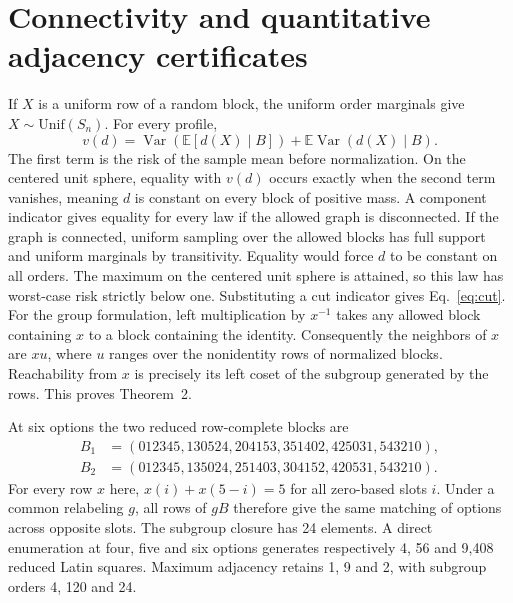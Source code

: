 \section{Connectivity and quantitative adjacency certificates}
\label{app:connectivity}
If $X$ is a uniform row of a random block, the uniform order marginals
give $X\sim\mathrm{Unif}(S_n)$. For every profile,
\[
 v(d)=\operatorname{Var}(\mathbb E[d(X)\mid B])
      +\mathbb E\operatorname{Var}(d(X)\mid B).
\]
The first term is the risk of the sample mean before normalization.
On the centered unit sphere, equality with $v(d)$ occurs exactly when
the second term vanishes, meaning $d$ is constant on every block of
positive mass. A component indicator gives equality for every law if
the allowed graph is disconnected. If the graph is connected, uniform
sampling over the allowed blocks has full support and uniform marginals
by transitivity. Equality would force $d$ to be constant on all orders.
The maximum on the centered unit sphere is attained, so this law has
worst-case risk strictly below one. Substituting a cut indicator gives
Eq.~\eqref{eq:cut}. For the group formulation, left multiplication by
$x^{-1}$ takes any allowed block containing $x$ to a block containing
the identity. Consequently the neighbors of $x$ are $xu$, where $u$
ranges over the nonidentity rows of normalized blocks. Reachability
from $x$ is precisely its left coset of the subgroup generated by the
rows. This proves Theorem~2.

At six options the two reduced row-complete blocks are
\[
\begin{split}
B_1&=(012345,130524,204153,351402,425031,543210),\\
B_2&=(012345,135024,251403,304152,420531,543210).
\end{split}
\]
For every row $x$ here, $x(i)+x(5-i)=5$ for all zero-based slots $i$.
Under a common relabeling $g$, all rows of $gB$ therefore give the
same matching of options across opposite slots. The subgroup closure
has 24 elements. A direct enumeration at four, five and six options
generates respectively 4, 56 and 9,408 reduced Latin squares. Maximum
adjacency retains 1, 9 and 2, with subgroup orders 4, 120 and 24.

